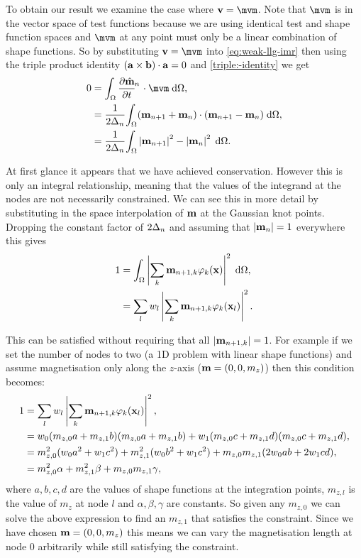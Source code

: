 To obtain our result we examine the case where $\testv = \mvm$.
Note that $\mvm$ is in the vector space of test functions because we are using identical test and shape function spaces and $\mvm$ at any point must only be a linear combination of shape functions.
So by substituting $\testv = \mvm$ into \eqref{eq:weak-llg-imr} then using the triple product identity $({\mathbf{a}} \times {\mathbf{b}}) \cdot {\mathbf{a}} = 0$ and \eqref{triple:-identity} we get
\begin{equation}
  \label{eq:23}
  \begin{aligned}
    0 &= \ipg{\dmdtm}{\mvm}, \\
    &= \frac{1}{2\dtn} \intd{(\mv_{n+1} + \mv_{n}) \cdot (\mv_{n+1} - \mv_n)}, \\
    &= \frac{1}{2\dtn} \intd{\abs{\mv_{n+1}}^2 - \abs{\mv_{n}}^2}.
  \end{aligned}
\end{equation}

At first glance it appears that we have achieved conservation.
However this is only an integral relationship, meaning that the values of the integrand at the nodes are not necessarily constrained.
We can see this in more detail by substituting in the space interpolation of $\mathbf{m}$ at the Gaussian knot points.
Dropping the constant factor of $2\Delta_{n}$ and assuming that $\left|{\mathbf{m}_n} \right| = 1$ everywhere this gives
\begin{equation}
  \begin{aligned} 
    1 &= {\int_{\Omega} \left|{\sum_k \mathbf{m}_{n+1, k} \varphi_k(\mathbf{x})} \right|^2 {\; \text{d}} {\Omega}}, \\
    &= \sum_l w_l \left|{\sum_k \mathbf{m}_{n+1, k} \varphi_k(\mathbf{x}_l)} \right|^2.
  \end{aligned} 
\end{equation}

This can be satisfied without requiring that all $\left|{\mathbf{m}_{n+1, k}} \right| = 1$.
For example if we set the number of nodes to two (a 1D problem with linear shape functions) and assume magnetisation only along the $z$-axis (\ie  $\mathbf{m} = (0, 0, m_z)$) then this condition becomes:
\begin{equation}
  \begin{aligned}
    1 &= \sum_l w_l \left|{\sum_k \mathbf{m}_{n+1, k} \varphi_k(\mathbf{x}_l)} \right|^2, \\
    &= w_0 (m_{z,0} a + m_{z,1} b)(m_{z,0} a + m_{z,1} b) + w_1 (m_{z,0} c + m_{z,1} d)(m_{z,0} c + m_{z,1} d), \\
    &= m_{z,0}^2 (w_0 a^2 + w_1 c^2) + m_{z,1}^2 (w_0 b^2 + w_1 c^2) + m_{z,0} m_{z,1} (2w_0ab + 2w_1cd), \\
    &= m_{z,0}^2 \alpha + m_{z,1}^2 \beta + m_{z,0} m_{z,1} \gamma, \\
  \end{aligned}
\end{equation}
where $a,b,c,d$ are the values of shape functions at the integration points, $m_{z,l}$ is the value of $m_z$ at node $l$ and $\alpha, \beta, \gamma$ are constants.
So given any $m_{z,0}$ we can solve the above expression to find an $m_{z,1}$ that satisfies the constraint.
Since we have chosen $\mathbf{m} = (0, 0, m_z)$ this means we can vary the magnetisation length at node 0 arbitrarily while still satisfying the constraint.

